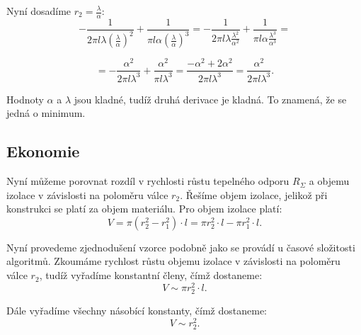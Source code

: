\documentclass{article}
\begin{document}
Nyní dosadíme $r_2 = \frac{\lambda}{\alpha}$:
$$
    -\frac{1}{2 \pi l \lambda \left( \frac{\lambda}{\alpha} \right)^2} + \frac{1}{\pi l \alpha \left( \frac{\lambda}{\alpha} \right)^3} = -\frac{1}{2 \pi l \lambda \frac{\lambda^2}{\alpha^2}} + \frac{1}{\pi l \alpha \frac{\lambda^3}{\alpha^3}} =
$$

$$
    = -\frac{\alpha^2}{2 \pi l \lambda^3} + \frac{\alpha^2}{\pi l \lambda^3} = \frac{-\alpha^2 + 2 \alpha^2}{2 \pi l \lambda^3} = \frac{\alpha^2}{2 \pi l \lambda^3}.
$$

Hodnoty $\alpha$ a $\lambda$ jsou kladné, tudíž druhá derivace je kladná. To znamená, že se jedná o minimum.

\begin{center}
\end{center}


\subsection{Ekonomie}

Nyní můžeme porovnat rozdíl v rychlosti růstu tepelného odporu $R_\Sigma$ a objemu izolace v závislosti na poloměru válce $r_2$. Řešíme objem izolace, jelikož při konstrukci se platí za objem materiálu. Pro objem izolace platí:
$$
    V = \pi (r_2^2 - r_1^2) \cdot l = \pi r_2^2 \cdot l - \pi r_1^2 \cdot l.
$$

Nyní provedeme zjednodušení vzorce podobně jako se provádí u časové složitosti algoritmů. Zkoumáme rychlost růstu objemu izolace v závislosti na poloměru válce $r_2$, tudíž vyřadíme konstantní členy, čímž dostaneme:
$$
    V \sim \pi r_2^2 \cdot l.
$$

Dále vyřadíme všechny násobící konstanty, čímž dostaneme:
$$
    V \sim r_2^2.
$$
\end{document}
